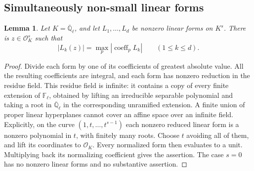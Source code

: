 \documentclass[11pt,a4paper]{article}
\newtheorem{lemma}[theorem]{Lemma}
\theoremstyle{definition}
\newcommand{\Q}{\mathbb Q}
\newcommand{\F}{\mathbb F}
\newcommand{\abs}[1]{\left|#1\right|}
\begin{document}
\subsection{Simultaneously non-small linear forms}
\begin{lemma}\label{lem:generic-residue}
Let \(K=\overline{\Q}_\ell\), and let \(L_1,\ldots,L_d\) be nonzero linear
forms on \(K^s\). There is \(z\in\mathcal O_K^s\) such that
\[
 \abs{L_k(z)}=\max_p\abs{\operatorname{coeff}_p L_k}\qquad(1\le k\le d).
\]
\end{lemma}
\begin{proof}
Divide each form by one of its coefficients of greatest absolute value.
All the resulting coefficients are integral, and each form has nonzero
reduction in the residue field. This residue field is infinite:
it contains a copy of every finite extension of \(\F_\ell\), obtained by
lifting an irreducible separable polynomial and taking a root in
\(\overline{\Q}_\ell\) in the corresponding unramified extension.
A finite union of proper linear hyperplanes cannot cover an affine space
over an infinite field. Explicitly, on the curve
\((1,t,\ldots,t^{s-1})\) each nonzero reduced linear form is a nonzero
polynomial in \(t\), with finitely many roots. Choose \(t\) avoiding all
of them, and lift its coordinates to \(\mathcal O_K\).
Every normalized form then evaluates to a unit. Multiplying back its
normalizing coefficient gives the assertion. The case \(s=0\) has no
nonzero linear forms and no substantive assertion.
\end{proof}
\end{document}
